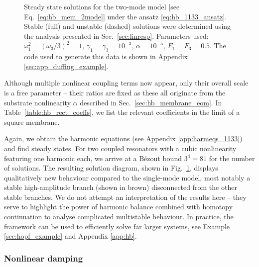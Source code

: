 %
\begin{figure}
	\centering
	
	\caption{Steady state solutions for the two-mode model [see Eq.~\eqref{eq:hb_mem_2mode}] under the ansatz \eqref{eq:hb_1133_ansatz}. Stable (full) and unstable (dashed) solutions were determined using the analysis presented in Sec.~\ref{sec:linresp}. Parameters used: $\omega_1^2 = (\omega_3/3)^2 = 1, \, \gamma_1 = \gamma_3 = 10^{-3},\, \alpha = 10^{-5}, \, F_1 = F_3 = 0.5 $. The code used to generate this data is shown in Appendix \ref{sec:app_duffing_example}.}
	\label{fig:hb_rect_ss1}
\end{figure} 
Although multiple nonlinear coupling terms now appear, only their overall scale is a free parameter -- their ratios are fixed as these all originate from the substrate nonlinearity $\alpha$ described in Sec.~\ref{sec:hb_membrane_eom}. In Table~\ref{table:hb_rect_coeffs}, we list the relevant coefficients in the limit of a square membrane.

Again, we obtain the harmonic equations (see Appendix \ref{app:harmeqs_1133}) and find steady states. For two coupled resonators with a cubic nonlinearity featuring one harmonic each, we arrive at a B\'{e}zout bound $3^4 = 81$ for the number of solutions. The resulting solution diagram, shown in Fig.~\ref{fig:hb_rect_ss1}, displays qualitatively new behaviour compared to the single-mode model, most notably a stable high-amplitude branch (shown in brown) disconnected from the other stable branches. We do not attempt an interpretation of the results here -- they serve to highlight the power of harmonic balance combined with homotopy continuation to analyse complicated multistable behaviour. In practice, the framework can be used to efficiently solve far larger systems, see Example \ref{sec:hopf_example} and Appendix \ref{app:hb}. 

\subsubsection{Nonlinear damping}

